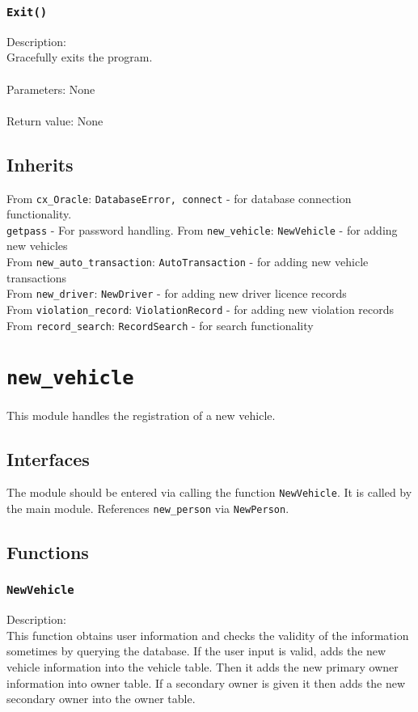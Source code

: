 \documentclass[12pt]{article}
\begin{document}
\subsubsection{\texttt{Exit()}}
Description: \\
\indent Gracefully exits the program.\\\\
Parameters: None\\\\
Return value: None


\subsection{Inherits}
From \texttt{cx\_Oracle}: \texttt{DatabaseError, connect} - for database connection functionality.\\
\texttt{getpass} - For password handling.
From \texttt{new\_vehicle}: \texttt{NewVehicle} - for adding new vehicles\\
From \texttt{new\_auto\_transaction}: \texttt{AutoTransaction} - for adding new vehicle transactions\\
From \texttt{new\_driver}: \texttt{NewDriver} - for adding new driver licence records\\
From \texttt{violation\_record}: \texttt{ViolationRecord} - for adding new violation records \\
From \texttt{record\_search}: \texttt{RecordSearch} - for search functionality

\newpage
\section{\texttt{new\_vehicle}}
This module handles the registration of a new vehicle.
\subsection{Interfaces}
The module should be entered via calling the function \texttt{NewVehicle}. It is called by the main module.
References \texttt{new\_person} via \texttt{NewPerson}.
\subsection{Functions}
\subsubsection{\texttt{NewVehicle}}
Description:\\
\indent This function obtains user information and checks the
validity of the information sometimes by querying the
database. If the user input is valid, adds the new vehicle
information into the vehicle table.
Then it adds the new primary owner information into owner table.
If a secondary owner is given it then adds the new secondary
owner into the owner table.
\end{document}
